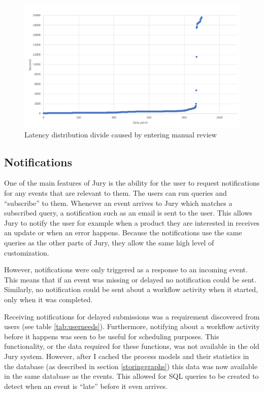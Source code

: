 \begin{figure}[p]
    \centering \includegraphics[width=0.9\linewidth]{gfx/graphs/manualreview.png}
    \caption{Latency distribution divide caused by entering manual review}
    \label{fig:manualreview}
\end{figure}

\subsection{Notifications}
\label{sec:notifications}

One of the main features of Jury is the ability for the user to request notifications for any events that are relevant to them.
The users can run queries and ``subscribe'' to them.
Whenever an event arrives to Jury which matches a subscribed query, a notification such as an email is sent to the user.
This allows Jury to notify the user for example when a product they are interested in receives an update or when an error happens.
Because the notifications use the same queries as the other parts of Jury, they allow the same high level of customization.

However, notifications were only triggered as a response to an incoming event.
This means that if an event was missing or delayed no notification could be sent.
Similarly, no notification could be sent about a workflow activity when it started, only when it was completed.

Receiving notifications for delayed submissions was a requirement discovered from users (see table \ref{tab:userneeds}).
Furthermore, notifying about a workflow activity before it happens was seen to be useful for scheduling purposes.
This functionality, or the data required for these functions, was not available in the old Jury system.
However, after I cached the process models and their statistics in the database (as described in section \ref{storinggraphs}) this data was now available in the same database as the events.
This allowed for SQL queries to be created to detect when an event is ``late'' before it even arrives.

